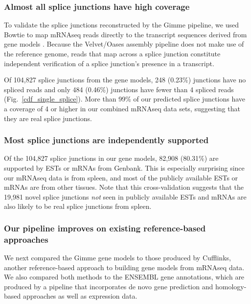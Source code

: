 \documentclass[10pt]{article}
\begin{document}
\subsubsection*{Almost all splice junctions have high coverage}

To validate the splice junctions reconstructed by the Gimme pipeline,
we used Bowtie to map mRNAseq reads directly to the transcript sequences
derived from gene models \cite{Langmead:2009fv}.  Because the
Velvet/Oases assembly pipeline does not make use of the reference
genome, reads that map across a splice junction constitute independent
verification of a splice junction's presence in a transcript.

Of 104,827 splice junctions from the gene models, 248 (0.23\%)
junctions have no spliced reads and only 484 (0.46\%) junctions
have fewer than 4 spliced reads (Fig.~\ref{cdf_single_splice}).
More than 99\% of our predicted splice junctions have a coverage
of 4 or higher in our combined mRNAseq data sets, suggesting that they are
real splice junctions.

\subsubsection*{Most splice junctions are independently supported}

Of the 104,827 splice junctions in our gene models, 82,908 (80.31\%)
are supported by ESTs or mRNAs from Genbank.  This is especially
surprising since our mRNAseq data is from spleen, and most of the
publicly available ESTs or mRNAs are from other tissues.  Note that this
cross-validation suggests that the 19,981 novel splice junctions {\em not}
seen in publicly available ESTs and mRNAs are also likely to be real
splice junctions from spleen.

\subsubsection*{Our pipeline improves on existing reference-based approaches}

We next compared the Gimme gene models to those produced by Cufflinks,
another reference-based approach to building gene models from mRNAseq
data\cite{Trapnell:2010kd}.  We also compared both methods to the ENSEMBL gene annotations,
which are produced by a pipeline that incorporates de novo gene
prediction and homology-based approaches as well as expression data.
\end{document}
